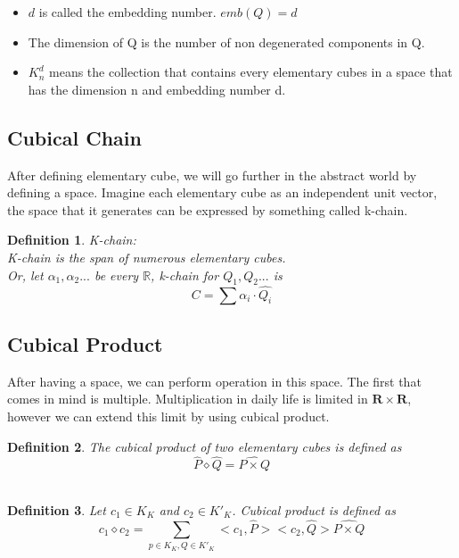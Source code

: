 \documentclass[12pt,letterpaper]{article}
\newtheorem{mydef}{Definition}
\begin{document}
\begin{normalsize}
\begin{itemize}
        \item $d$ is called the embedding number. $emb(Q) = d$
        \item The dimension of Q is the number of non degenerated components in Q.
        \item $K^d_n$ means the collection that contains every elementary cubes in a space that has the dimension n and embedding number d.
    \end{itemize}
\subsection{Cubical Chain}
After defining elementary cube, we will go further in the abstract world by defining a space. Imagine each elementary cube as an independent unit vector, the space that it generates can be expressed by something called k-chain.
\begin{mydef}\label{def:def444} 
K-chain:  \\
        K-chain is the span of numerous elementary cubes. \\
        Or, 
        let $\alpha_1, \alpha_2 ...$ be every $\mathbb{R}$, k-chain for $Q_1, Q_2 ...$ is \\
        $$C = \sum \alpha_i \cdot \widehat{Q_i}$$
        
\end{mydef}
\subsection{Cubical Product}
After having a space, we can perform operation in this space. The first that comes in mind is multiple. Multiplication in daily life is limited in $\mathbf{R}\times \mathbf{R}$, however we can extend this limit by using cubical product.
\begin{mydef}\label{def:def444}  
The cubical product of two elementary cubes is defined as
$$\widehat{P} \diamond \widehat{Q} = \widehat{P \times Q}$$
\\[10pt]
\end{mydef}

\begin{mydef}\label{def:def444} 
Let $c_1 \in K_K$ and $c_2 \in K'_K$. Cubical product is defined as
$$c_1 \diamond c_2 = \sum_{p\in K_K,Q \in K'_K}<c_1, \widehat{P}><c_2, \widehat{Q}> \widehat{P \times Q}$$
\\[10pt]
\end{mydef}


\end{normalsize}
\end{document}
